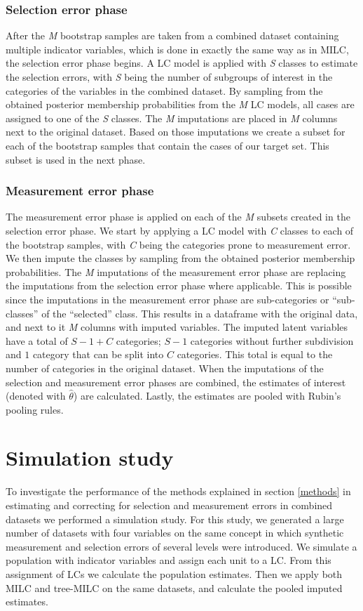 \documentclass[a4paper, 11pt]{article} %
\begin{document}
\subsubsection{Selection error phase}
After the \textit{M} bootstrap samples are taken from a combined dataset containing multiple indicator variables, which is done in exactly the same way as in MILC, the selection error phase begins. A LC model is applied with \textit{S} classes to estimate the selection errors, with \textit{S} being the number of subgroups of interest in the categories of the variables in the combined dataset. By sampling from the obtained posterior membership probabilities from the \textit{M} LC models, all cases are assigned to one of the \textit{S} classes. The \textit{M} imputations are placed in \textit{M} columns next to the original dataset. Based on those imputations we create a subset for each of the bootstrap samples that contain the cases of our target set. This subset is used in the next phase.

\subsubsection{Measurement error phase}
 The measurement error phase is applied on each of the \textit{M} subsets created in the selection error phase. We start by applying a LC model with \textit{C} classes to each of the bootstrap samples, with \textit{C} being the categories prone to measurement error. We then impute the classes by sampling from the obtained posterior membership probabilities. The \textit{M} imputations of the measurement error phase are replacing the imputations from the selection error phase where applicable. This is possible since the imputations in the measurement error phase are sub-categories or ``sub-classes'' of the ``selected'' class. This results in a dataframe with the original data, and next to it \textit{M} columns with imputed variables. The imputed latent variables have a total of $S-1+C$ categories; $S-1$ categories without further subdivision and $1$ category that can be split into $C$ categories. This total is equal to the number of categories in the original dataset. When the imputations of the selection and measurement error phases are combined, the estimates of interest (denoted with $\hat\theta$) are calculated. Lastly, the estimates are pooled with Rubin's pooling rules.

\section{Simulation study} \label{ch_simstudy}
To investigate the performance of the methods explained in section \ref{methods} in estimating and correcting for selection and measurement errors in combined datasets we performed a simulation study. For this study, we generated a large number of datasets with four variables on the same concept in which synthetic measurement and selection errors of several levels were introduced. We simulate a population with indicator variables and assign each unit to a LC. From this assignment of LCs we calculate the population estimates. Then we apply both MILC and tree-MILC on the same datasets, and calculate the pooled imputed estimates. 
\end{document}
